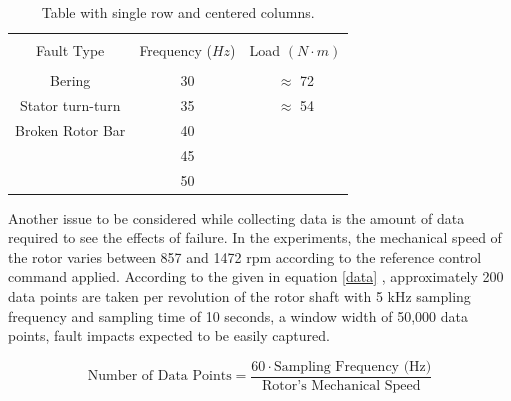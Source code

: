 \begin{table}[h]
	{\setlength{\tabcolsep}{12pt}
		\caption{Table with single row and centered columns.}
		\begin{center}
			\vspace{-6mm}
			\begin{tabular}{ccc}
				\hline \\[-2.45ex] \hline \\[-2.1ex]
				Fault Type & Frequency ($Hz$) & Load $(N\cdot m)$ \\
				\hline \\[-1.8ex]
				Bering & 30 & $\approx$ 72  \\
				Stator turn-turn & 35 & $\approx$ 54  \\
				Broken Rotor Bar & 40 &  \\
				& 45 &   \\
				& 50 &   \\
				\hline
			\end{tabular}
			\vspace{-6mm}
		\end{center}
		\label{Table3.1}}
\end{table}

Another issue to be considered while collecting data is the amount of data required to see the effects of failure. In the experiments, the mechanical speed of the rotor varies between 857 and 1472 rpm according to the reference control command applied. According to the given in equation \ref{data} \cite{shenfield2020novel}, approximately 200 data points are taken per revolution of the rotor shaft with 5 kHz sampling frequency and sampling time of 10 seconds, a window width of 50,000 data points, fault impacts expected to be easily captured.

\begin{equation}
	\text{Number of Data Points} = \displaystyle \frac{60 \cdot \text{Sampling Frequency (Hz)}}{\text{Rotor's Mechanical Speed}}
	\label{data}
\end{equation}






